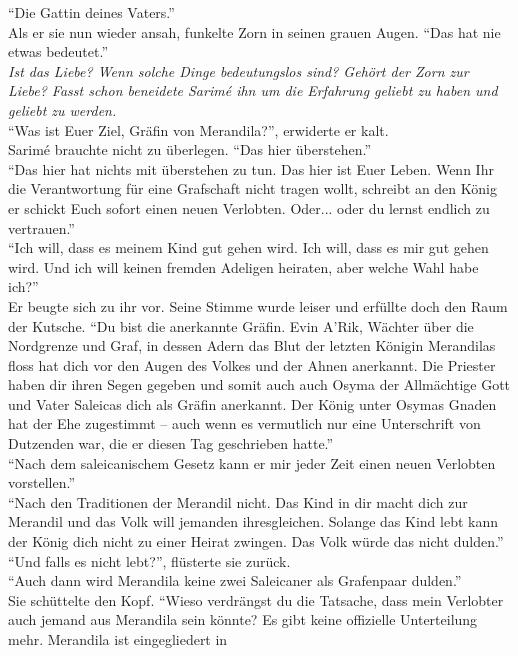 ``Die Gattin deines Vaters.''\\
Als er sie nun wieder ansah, funkelte Zorn in seinen grauen Augen. ``Das hat nie etwas bedeutet.''\\
\textit{Ist das Liebe? Wenn solche Dinge bedeutungslos sind? Gehört der Zorn zur Liebe?
Fasst schon beneidete Sarimé ihn um die Erfahrung geliebt zu haben und geliebt zu werden.}\\
``Was ist Euer Ziel, Gräfin von Merandila?'', erwiderte er kalt.\\
Sarimé brauchte nicht zu überlegen. ``Das hier überstehen.''\\
``Das hier hat nichts mit überstehen zu tun. Das hier ist Euer Leben. Wenn Ihr die Verantwortung 
für 
eine Grafschaft nicht tragen wollt, schreibt an den König er schickt Euch sofort einen neuen 
Verlobten. Oder... oder du lernst endlich zu vertrauen.''\\
``Ich will, dass es meinem Kind gut gehen wird. Ich will, dass es mir gut gehen wird. Und ich will 
keinen fremden Adeligen heiraten, aber welche Wahl habe ich?''\\
Er beugte sich zu ihr vor. Seine Stimme wurde leiser und erfüllte doch den Raum der Kutsche. ``Du 
bist die anerkannte Gräfin. Evin A'Rik, Wächter über die Nordgrenze und Graf, in dessen Adern das 
Blut der letzten Königin Merandilas floss hat dich vor den Augen des Volkes und der Ahnen 
anerkannt. 
Die Priester haben dir ihren Segen gegeben und somit auch auch Osyma der Allmächtige Gott und Vater 
Saleicas dich als Gräfin anerkannt. Der König unter Osymas Gnaden hat der Ehe zugestimmt – auch 
wenn 
es vermutlich nur eine Unterschrift von Dutzenden war, die er diesen Tag geschrieben hatte.''\\
``Nach dem saleicanischem Gesetz kann er mir jeder Zeit einen neuen Verlobten vorstellen.''\\
``Nach den Traditionen der Merandil nicht. Das Kind in dir macht dich zur Merandil und das Volk 
will jemanden ihresgleichen. Solange das Kind lebt kann der König dich nicht zu einer Heirat 
zwingen. Das Volk würde das nicht dulden.''\\
``Und falls es nicht lebt?'', flüsterte sie zurück.\\
``Auch dann wird Merandila keine zwei Saleicaner als Grafenpaar dulden.''\\
Sie schüttelte den Kopf. ``Wieso verdrängst du die Tatsache, dass mein Verlobter auch jemand aus 
Merandila sein könnte? Es gibt keine offizielle Unterteilung mehr. Merandila ist eingegliedert in 

